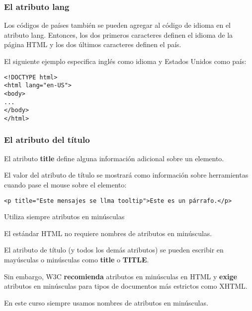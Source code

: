 \begin{frame}[fragile]
  \frametitle{El atributo lang}

  Los códigos de países también se pueden agregar al código de idioma
  en el atributo lang. Entonces, los dos primeros caracteres definen
  el idioma de la página HTML y los dos últimos caracteres definen el
  país.

  El siguiente ejemplo especifica inglés como idioma y Estados Unidos
  como país:

  \vspace{\baselineskip}
  \begin{lstlisting}
<!DOCTYPE html>
<html lang="en-US">
<body>
...
</body>
</html>
  \end{lstlisting}
\end{frame}

\begin{frame}[fragile]
  \frametitle{El atributo del título}

  El atributo \textbf{title} define alguna información adicional
  sobre un elemento.

  \vspace{\baselineskip}
  El valor del atributo de título se mostrará como información
  sobre herramientas cuando pase el mouse sobre el elemento:

  \vspace{\baselineskip}
  \begin{lstlisting}
<p title="Este mensajes se llma tooltip">Este es un párrafo.</p>
  \end{lstlisting}
\end{frame}

\begin{frame}[c]{Utiliza siempre atributos en minúsculas}

  El estándar HTML no requiere nombres de atributos en minúsculas.

  \vspace{\baselineskip}
  El atributo de título (y todos los demás atributos) se
  pueden escribir en mayúsculas o minúsculas como \textbf{title} o
  \textbf{TITLE}.

  \vspace{\baselineskip}
  Sin embargo, W3C \textbf{recomienda} atributos en minúsculas en HTML y
  \textbf{exige} atributos en minúsculas para tipos de documentos más
  estrictos como XHTML.

  \begin{block}{}
    En este curso siempre usamos nombres de atributos en minúsculas.
  \end{block}
\end{frame}

